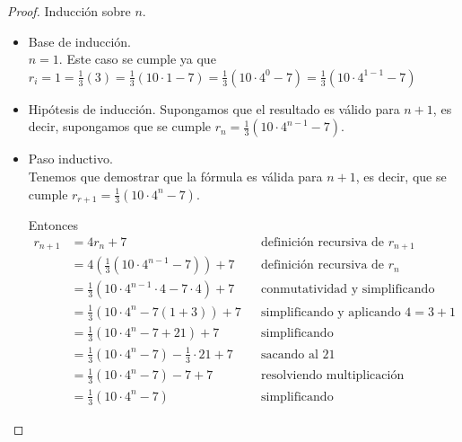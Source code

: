 \documentclass[letterpaper,11pt]{article}
\begin{document}
\begin{enumerate}
    \begin{proof}
        Inducción sobre $n$.

        \begin{itemize}
            \item Base de inducción. \\ 
            $n = 1$. Este caso se cumple ya que $r_{i} = 1 = \frac{1}{3}(3) =
            \frac{1}{3}(10 ⋅ 1 - 7) = \frac{1}{3}(10 ⋅ 4^{0} - 7) = 
            \frac{1}{3}(10 ⋅ 4 ^{1-1} - 7)$

            \item Hipótesis de inducción. Supongamos que el resultado es válido 
            para $n + 1$, es decir, supongamos que se cumple 
            $r_{n} = \frac{1}{3}(10 ⋅ 4^{n - 1} - 7)$.

            \item Paso inductivo. \\ 
            Tenemos que demostrar que la fórmula es válida para $n + 1$, es
            decir, que se cumple $r_{r+1} = \frac{1}{3}(10 ⋅ 4^{n} - 7)$.
            
            Entonces 
            \begin{align*}
                r_{n+1} 
                &= 4r_{n} + 7
                && \text{definición recursiva de $r_{n+1}$} \\ 
                &= 4(\frac{1}{3}(10 ⋅ 4^{n-1} - 7)) + 7
                && \text{definición recursiva de $r_{n}$} \\ 
                &= \frac{1}{3}(10 ⋅ 4^{n-1} ⋅ 4 - 7 ⋅ 4) + 7
                && \text{conmutatividad y simplificando} \\ 
                &= \frac{1}{3}(10 ⋅ 4^{n} - 7 (1+3)) + 7
                && \text{simplificando y aplicando $4 = 3 + 1$} \\
                &= \frac{1}{3}(10 ⋅ 4^{n} - 7 + 21) + 7 
                && \text{simplificando} \\
                &= \frac{1}{3}(10 ⋅ 4^{n} - 7) - \frac{1}{3} ⋅ 21 + 7
                && \text{sacando al $21$} \\ 
                &= \frac{1}{3}(10 ⋅ 4^{n} - 7) - 7 + 7
                && \text{resolviendo multiplicación} \\ 
                &= \frac{1}{3}(10 ⋅ 4^{n} - 7)
                && \text{simplificando}
            \end{align*}
        \end{itemize}
    \end{proof}


\end{enumerate}
\end{document}
